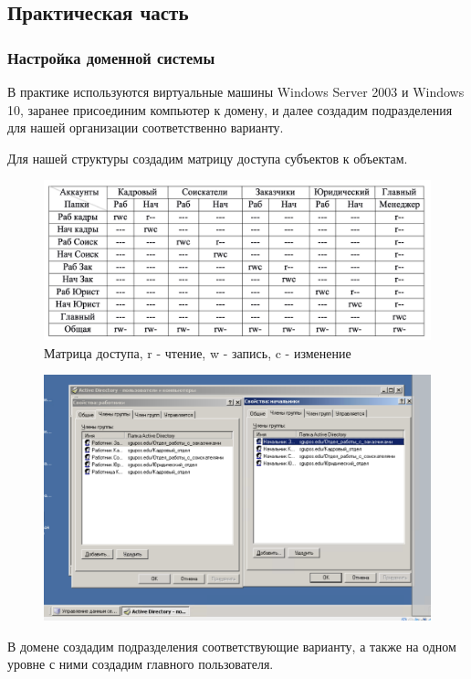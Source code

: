 \subsection{Практическая часть}
\subsubsection{Настройка доменной системы}
В практике используются виртуальные машины Windows Server 2003 и Windows 10, 
заранее присоединим компьютер к домену, и далее создадим подразделения для
нашей организации соответственно варианту.

Для нашей структуры создадим матрицу доступа субъектов к объектам.
\begin{figure}[H]
  \centering
  \includegraphics[width=1\textwidth]{pict/102}
  \caption{Матрица доступа, r - чтение, w - запись, c - изменение}
  \label{fig:101}
\end{figure}

\begin{figure}[H]
  \centering
  \includegraphics[width=1\textwidth]{pict/prac/54}
  \caption{}
\end{figure}

В домене создадим подразделения соответствующие варианту, а также на одном уровне с ними создадим 
главного пользователя.

